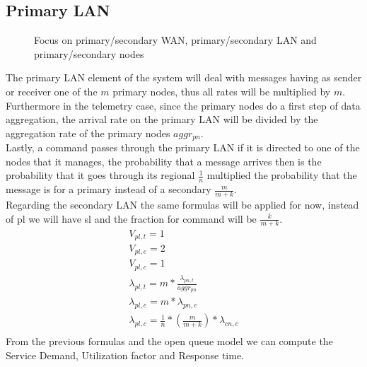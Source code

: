 \documentclass[11pt]{article}
\begin{document}
\subsection{Primary LAN}

\begin{figure}[H]
	\hspace*{-3.75cm}
	\centering
	\frame{}
	\caption{Focus on primary/secondary WAN, primary/secondary LAN and primary/secondary nodes}
\end{figure}

The primary LAN element of the system will deal with messages having as sender or receiver one of the $m$ primary nodes, thus all rates will be multiplied by $m$.\\
Furthermore in the telemetry case, since the primary nodes do a first step of data aggregation, the arrival rate on the primary LAN will be divided by the aggregation rate of the primary nodes $aggr_{pn}$. \\
Lastly, a command passes through the primary LAN if it is directed to one of the nodes that it manages, the probability that a message arrives then is the probability that it goes through its regional $\frac{1}{n}$ multiplied the probability that the message is for a primary instead of a secondary $\frac{m}{m+k}$.\\
Regarding the secondary LAN the same formulas will be applied for now, instead of pl we will have sl and the fraction for command will be $\frac{k}{m+k}$.
\begin{equation}
    \begin{array}{l}
        V_{pl, t} = 1 \\
        V_{pl, e} = 2 \\ %
        V_{pl,c} = 1 \\
        \lambda_{pl, t} = m*\frac{\lambda_{pn, t}}{aggr_{pn}} \\
        \lambda_{pl, e} = m*\lambda_{pn, e} \\
        \lambda_{pl, c} = \frac{1}{n} * (\frac{m}{m+k}) * \lambda_{cn, c}  \\\
    \end{array}
\end{equation}
From the previous formulas and the open queue model we can compute the Service Demand, Utilization factor and Response time.
\end{document}
